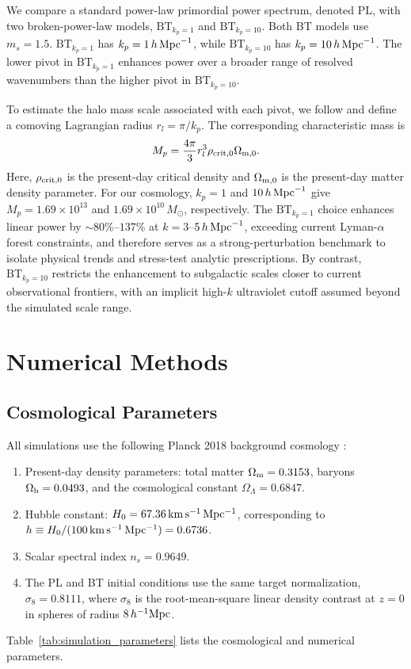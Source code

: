 \documentclass[
 reprint,
 superscriptaddress,
 nofootinbib,
 nobibnotes,
 amsmath,
 amssymb,
 aps,
 prd,
 floatfix,
 longbibliography
]{revtex4-2}
\DeclareRobustCommand{\BTKPone}{\ensuremath{\mathrm{BT}_{k_p=1}}}
\DeclareRobustCommand{\BTKPten}{\ensuremath{\mathrm{BT}_{k_p=10}}}
\begin{document}
We compare a standard power-law primordial power spectrum, denoted PL, with two broken-power-law models, \BTKPone{} and \BTKPten{}. Both BT models use \(m_s=1.5\). \BTKPone{} has \(k_p=1\,h\,{\rm Mpc}^{-1}\), while \BTKPten{} has \(k_p=10\,h\,{\rm Mpc}^{-1}\). The lower pivot in \BTKPone{} enhances power over a broader range of resolved wavenumbers than the higher pivot in \BTKPten{}.

To estimate the halo mass scale associated with each pivot, we follow \citet{Wu25BT} and define a comoving Lagrangian radius \(r_l=\pi/k_p\). The corresponding characteristic mass is
\begin{equation}
M_p=\frac{4\pi}{3}r_l^3\rho_{{\rm crit},0}\Omega_{{\rm m},0}.
\label{eq:pivot_mass}
\end{equation}
Here, \(\rho_{{\rm crit},0}\) is the present-day critical density and \(\Omega_{{\rm m},0}\) is the present-day matter density parameter. For our cosmology, \(k_p=1\) and \(10\,h\,{\rm Mpc}^{-1}\) give \(M_p=1.69\times10^{13}\) and \(1.69\times10^{10}\,M_\odot\), respectively. The \BTKPone{} choice enhances linear power by \(\sim80\%\)--\(137\%\) at \(k=3\)--\(5\,h\,{\rm Mpc}^{-1}\), exceeding current Lyman-\(\alpha\) forest constraints, and therefore serves as a strong-perturbation benchmark to isolate physical trends and stress-test analytic prescriptions. By contrast, \BTKPten{} restricts the enhancement to subgalactic scales closer to current observational frontiers, with an implicit high-\(k\) ultraviolet cutoff assumed beyond the simulated scale range.

\section{Numerical Methods}
\label{sec:numerical}

\subsection{Cosmological Parameters}
\label{subsec:cosmo_params}

All simulations use the following Planck 2018 background cosmology \citep{Planck20CMB}:

\begin{enumerate}
    \item Present-day density parameters: total matter \(\Omega_{\rm m}=0.3153\), baryons \(\Omega_{\rm b}=0.0493\), and the cosmological constant \(\Omega_\Lambda=0.6847\).
    \item Hubble constant: \(H_0=67.36\,{\rm km\,s^{-1}\,Mpc^{-1}}\), corresponding to \(h\equiv H_0/(100\,{\rm km\,s^{-1}\,Mpc^{-1}})=0.6736\).
    \item Scalar spectral index \(n_s = 0.9649\).
    \item The PL and BT initial conditions use the same target normalization, \(\sigma_8 = 0.8111\), where \(\sigma_8\) is the root-mean-square linear density contrast at \(z=0\) in spheres of radius \(8\,h^{-1}{\rm Mpc}\).
\end{enumerate}
Table~\ref{tab:simulation_parameters} lists the cosmological and numerical parameters.
\end{document}
